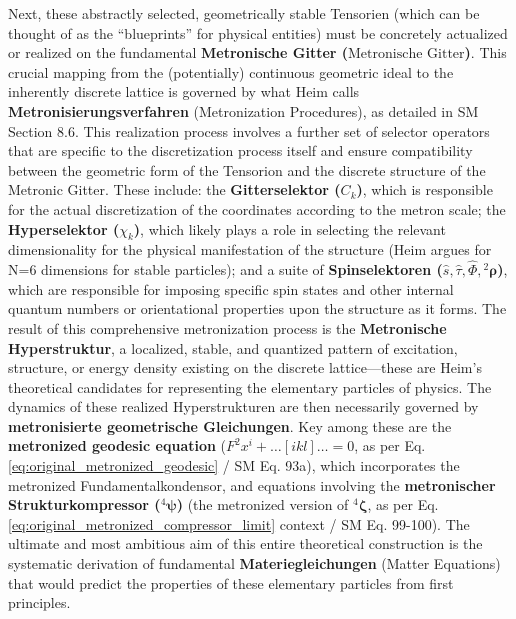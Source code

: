 \documentclass[12pt]{article}
\newcommand{\q}[1]{\enquote{#1}}
\newcommand{\metronischegitter}{\text{Metronische Gitter}}
\newcommand{\metrondifferential}{F} %
\newcommand{\strukturkompressor}{{}^4\bm{\zeta}}
\newcommand{\metronischerstrukturkompressor}{{}^4\bm{\psi}} %
\begin{document}
Next, these abstractly selected, geometrically stable Tensorien (which can be thought of as the \q{blueprints} for physical entities) must be concretely actualized or realized on the fundamental \textbf{Metronische Gitter (\(\metronischegitter\))}. This crucial mapping from the (potentially) continuous geometric ideal to the inherently discrete lattice is governed by what Heim calls \textbf{Metronisierungsverfahren} (Metronization Procedures), as detailed in SM Section 8.6. This realization process involves a further set of selector operators that are specific to the discretization process itself and ensure compatibility between the geometric form of the Tensorion and the discrete structure of the Metronic Gitter. These include: the \textbf{Gitterselektor (\(C_k\))}, which is responsible for the actual discretization of the coordinates according to the metron scale; the \textbf{Hyperselektor (\(\chi_k\))}, which likely plays a role in selecting the relevant dimensionality for the physical manifestation of the structure (Heim argues for N=6 dimensions for stable particles); and a suite of \textbf{Spinselektoren (\(\hat{s}, \hat{\tau}, \hat{\Phi}, {}^2\bm{\rho}\))}, which are responsible for imposing specific spin states and other internal quantum numbers or orientational properties upon the structure as it forms. The result of this comprehensive metronization process is the \textbf{Metronische Hyperstruktur}, a localized, stable, and quantized pattern of excitation, structure, or energy density existing on the discrete lattice—these are Heim's theoretical candidates for representing the elementary particles of physics. The dynamics of these realized Hyperstrukturen are then necessarily governed by \textbf{metronisierte geometrische Gleichungen}. Key among these are the \textbf{metronized geodesic equation} (\( \metrondifferential^2x^i + \dots[ikl]\dots = 0 \), as per Eq. \eqref{eq:original_metronized_geodesic} / SM Eq. 93a), which incorporates the metronized Fundamentalkondensor, and equations involving the \textbf{metronischer Strukturkompressor (\( \metronischerstrukturkompressor \))} (the metronized version of \( \strukturkompressor \), as per Eq. \eqref{eq:original_metronized_compressor_limit} context / SM Eq. 99-100). The ultimate and most ambitious aim of this entire theoretical construction is the systematic derivation of fundamental \textbf{Materiegleichungen} (Matter Equations) that would predict the properties of these elementary particles from first principles.
\end{document}
